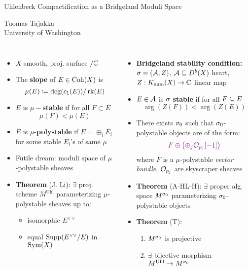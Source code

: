 \documentclass[8pt]{beamer}
\begin{document}
\begin{frame}{Uhlenbeck Compactification as a Bridgeland Moduli Space}
    
\begin{center}
{\large Tuomas Tajakka} \\
University of Washington
\end{center}

\begin{columns}[T]
    
    \begin{itemize}
        \item $X$ smooth, proj. surface $/\mathbb{C}$
        \item The {\bf \color{blue} slope} of $E \in \mathrm{Coh}(X)$ is
        \[ \mu(E) \coloneqq \deg(c_1(E))/\operatorname{\mathrm{rk}}(E) \]
        \item $E$ is {\color{blue} $\mu-${\bf stable}} if for all $F \subset E$
        \[ \mu(F) < \mu(E) \]
        \item $E$ is {\color{blue} $\mu$-{\bf polystable}} if $E = \oplus_i E_i$ for some stable $E_i$'s of same $\mu$
        \item Futile dream: moduli space of $\mu$-polystable sheaves
        \item {\bf Theorem} (J. Li): $\exists$ proj. scheme $M^{\mathrm{Uhl}}$ parameterizing $\mu$-polystable sheaves up to:
        \begin{itemize}
            \item \color{violet}isomorphic $E^{\vee\vee}$ 
            \item \color{violet} equal $\operatorname{\mathrm{Supp}}(E^{\vee\vee}/E)$ in $\mathrm{Sym}(X)$
        \end{itemize}
    \end{itemize}
    
    \begin{itemize}
        \item {\color{blue} \bf Bridgeland stability condition:} $\sigma = (\mathcal{A}, Z)$, $\mathcal{A} \subseteq D^b(X)$ heart, $Z: K_{\mathrm{num}}(X) \to \mathbb{C}$ linear map
        \item $E \in \mathcal{A}$ is {\color{blue} $\sigma$-{\bf stable}} if for all $F \subseteq E$
        \[ \arg(Z(F)) < \arg(Z(E)) \]
        \item There exists $\sigma_0$ such that $\sigma_0$-polystable objects are of the form:
        \[ \color{violet} F \oplus \left(\oplus_j \mathcal{O}_{p_j}[-1]\right) \]
        where $F$ is a $\mu$-polystable \emph{vector bundle}, $\mathcal{O}_{p_j}$ are skyscraper sheaves 
        \item {\bf Theorem} (A-HL-H): $\exists$ proper alg. space $M^{\sigma_0}$ parameterizing $\sigma_0$-polystable objects
        \item {\bf Theorem} (T):
        \begin{enumerate}
            \item $M^{\sigma_0}$ is projective
            \item $\exists$ bijective morphism $M^{\mathrm{Uhl}} \to M^{\sigma_0}$
        \end{enumerate} 
    \end{itemize}
    
\end{columns}
    
\end{frame}
\end{document}
